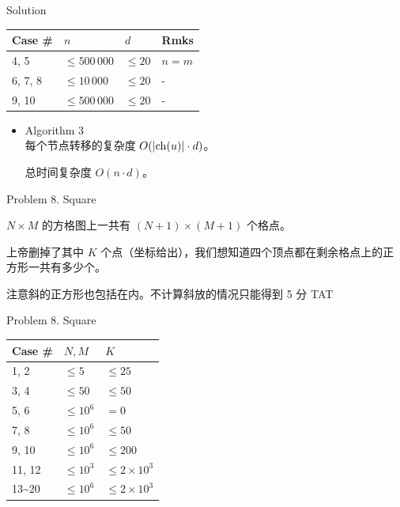 \documentclass[UTF8]{beamer}
\begin{document}
\begin{frame}{Solution}

\begin{tabularx}{\textwidth}{X|X|X|X} \hline
Case \# & $n$ & $d$ & Rmks \\ \hline \hline
4, 5    & $\leq 500\,000$ & $\leq 20$ & $n = m$ \\ \hline
6, 7, 8 & $\leq 10\,000$  & $\leq 20$ & - \\ \hline
9, 10   & $\leq 500\,000$ & $\leq 20$ & - \\ \hline
\end{tabularx}
\begin{itemize}
    \item Algorithm 3 \\
        每个节点转移的复杂度 $O(|{\rm ch}(u)| \cdot d)$。

        总时间复杂度 $O(n \cdot d)$。
\end{itemize}

\end{frame}


\begin{frame}{Problem 8. Square}

$N \times M$ 的方格图上一共有 $(N + 1) \times (M + 1)$ 个格点。

上帝删掉了其中 $K$ 个点（坐标给出），我们想知道四个顶点都在剩余格点上的正方形一共有多少个。

注意斜的正方形也包括在内。不计算斜放的情况只能得到 5 分 TAT

\end{frame}

\begin{frame}{Problem 8. Square}

\begin{tabularx}{\textwidth}{X|X|X} \hline
Case \# & $N, M$ & $K$ \\ \hline \hline
1, 2   & $\leq 5$    & $\leq 25$            \\ \hline
3, 4   & $\leq 50$   & $\leq 50$            \\ \hline
5, 6   & $\leq 10^6$ & $= 0$                \\ \hline
7, 8   & $\leq 10^6$ & $\leq 50$            \\ \hline
9, 10  & $\leq 10^6$ & $\leq 200$           \\ \hline
11, 12 & $\leq 10^3$ & $\leq 2 \times 10^3$ \\ \hline
13\textasciitilde 20 & $\leq 10^6$ & $\leq 2 \times 10^3$ \\ \hline
\end{tabularx}

\end{frame}
\end{document}
